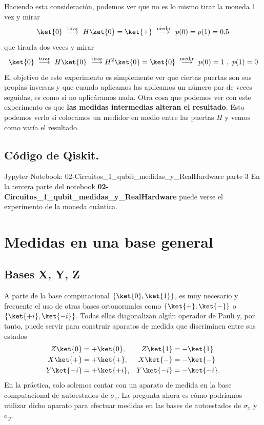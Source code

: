 \documentclass[a4paper,11pt]{book} %
\numberwithin{equation}{chapter}
\begin{document}
Haciendo esta consideración, podemos ver que no es lo mismo tirar la moneda 1 vez y mirar 
$$
\ket{0}~ \stackrel{\rm tirar}{\longrightarrow} ~ H \ket{0}= \ket{+} ~ \stackrel{\rm medir}{\longrightarrow} ~p(0) = p(1) = 0.5
$$
que tirarla dos veces y mirar
$$
\ket{0}~ \stackrel{\rm tirar}{\longrightarrow} ~ H \ket{0}~ \stackrel{\rm tirar}{\longrightarrow} H^2\ket{0} = \ket{0} ~ \stackrel{\rm medir}{\longrightarrow} ~p(0) = 1 ~,~p(1) = 0
$$
El objetivo de este experimento es simplemente ver que ciertas puertas son sus propias inversas y que cuando aplicamos las aplicamos un número par de veces seguidas, es como si no aplicáramos nada. Otra cosa que podemos ver con este experimento es que \textbf{las medidas intermedias alteran el resultado}. Esto podemos verlo si colocamos un medidor en medio entre las puertas $H$ y vemos como varía el resultado.



		\subsection{Código de Qiskit.}
		
	\begin{mybox_orange}{Jypyter Notebook: 02-Circuitos\_1\_qubit\_medidas\_y\_RealHardware parte 3}
	En la tercera parte del notebook \textbf{02-Circuitos\_1\_qubit\_medidas\_y\_RealHardware} puede verse el experimento de la moneda cuántica.
	\end{mybox_orange}
    
    
    \section{Medidas en una base general}
        \subsection{Bases X, Y, Z} \label{sec_subsub_medidad1_bases_xyz}
       
A parte de la base computacional $\{\ket{0},\ket{1} \}$, es muy necesario y frecuente el uso de otras bases ortonormales como  $\{\ket{+},\ket{-} \}$ o  $\{\ket{+i},\ket{-i} \}$. Todas ellas diagonalizan algún operador de Pauli y, por  tanto, puede servir para construir aparatos de medida que discriminen entre sus estados       
\begin{align}
Z \ket{0} &=+ \ket{0}   , & Z \ket{1} &=-\ket{1} \\ 
X \ket{+} &=+ \ket{+}    ,& X \ket{-} &=-\ket{-} \\ 
Y \ket{+i} &=+ \ket{+i}  ,& Y \ket{-i} &=-\ket{-i}.
\end{align}    
En la práctica, solo solemos contar con un aparato de medida en la base computacional de autoestados de $\sigma_z$. La pregunta ahora es cómo podríamos utilizar  dicho aparato para efectuar medidas en las bases de autoestados de $\sigma_x$ y $\sigma_y$.
\end{document}
